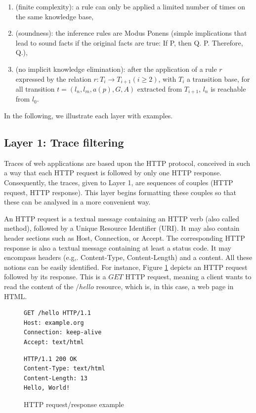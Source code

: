 \begin{enumerate}
\item (finite complexity): a rule can only be applied a limited
number of times on the same knowledge base,

\item (soundness): the inference rules are Modus Ponens (simple
implications that lead to sound facts if the original facts are
true: If P, then Q. P. Therefore, Q.),

\item (no implicit knowledge elimination): after the application
of a rule $r$ expressed by the relation $r: T_i \rightarrow
T_{i+1} (i\geq 2)$, with $T_i$ a transition base, for all
transition $t=(l_n,l_m,a(p),G,A)$ extracted from $T_{i+1}$, $l_n$
is reachable from $l_0$.
\end{enumerate}


In the following, we illustrate each layer with examples.

\subsection{Layer 1: Trace filtering}
\label{sec:modelinf:webapps:L1}

Traces of web applications are based upon the HTTP protocol,
conceived in such a way that each HTTP request is followed by
only one HTTP response. Consequently, the traces, given to Layer
1, are sequences of couples (HTTP request, HTTP response). This
layer begins formatting these couples so that these can be
analysed in a more convenient way.

An HTTP request is a textual message containing an HTTP verb
(also called method), followed by a Unique Resource Identifier
(URI). It may also contain header sections such as Host,
Connection, or Accept. The corresponding HTTP response is also a
textual message containing at least a status code. It may
encompass headers (e.g,.  Content-Type, Content-Length) and a
content. All these notions can be easily identified. For
instance, Figure \ref{fig:httpexample} depicts an HTTP request
followed by its response. This is a $GET$ HTTP request, meaning a
client wants to read the content of the $/hello$ resource, which
is, in this case, a web page in HTML.

\begin{figure}[ht]
\begin{framed}
\begin{BVerbatim}
GET /hello HTTP/1.1
Host: example.org
Connection: keep-alive
Accept: text/html
\end{BVerbatim}
\end{framed}

\begin{framed}
\begin{BVerbatim}
HTTP/1.1 200 OK
Content-Type: text/html
Content-Length: 13
Hello, World!
\end{BVerbatim}
\end{framed}

\caption{HTTP request/response example}
\label{fig:httpexample}
\end{figure}

